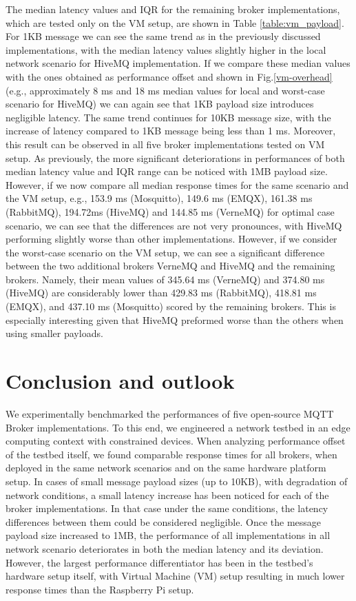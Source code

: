 \documentclass[conference]{IEEEtran}
\begin{document}
    The median latency values and IQR for the remaining broker implementations, which are tested only on
    the VM setup, are shown in Table \ref{table:vm_payload}. For 1KB message we can see the same trend
    as in the previously discussed implementations, with the median latency values slightly higher in
    the local network scenario for HiveMQ implementation. If we compare these median values with the
    ones obtained as performance offset and shown in Fig.\ref{vm-overhead} (e.g., approximately 8 ms and
    18 ms median values for local and worst-case scenario for HiveMQ) we can again see that 1KB
    payload size introduces negligible latency. The same trend continues for 10KB message size, with
    the increase of latency compared to 1KB message being less than 1 ms. Moreover, this result can be observed in all five broker implementations tested on VM setup. As previously, the more significant deteriorations in performances of both median latency value and IQR range can be noticed with 1MB payload size. However, if we now compare all median response times for the same scenario and the VM setup, e.g., 153.9 ms (Mosquitto), 149.6 ms (EMQX), 161.38 ms (RabbitMQ), 194.72ms (HiveMQ) and 144.85 ms (VerneMQ) for optimal case scenario, we can see that the differences are not very pronounces, with HiveMQ performing slightly worse than other implementations. 
    However, if we consider the worst-case scenario on the VM setup, we can see a significant difference
    between the two additional brokers VerneMQ and HiveMQ and the remaining brokers. Namely, their mean
    values of 345.64 ms (VerneMQ) and 374.80 ms (HiveMQ) are considerably lower than 429.83 ms
    (RabbitMQ), 418.81 ms (EMQX), and 437.10 ms (Mosquitto) scored by the remaining brokers. This is
    especially interesting given that HiveMQ preformed worse than the others when using
    smaller payloads.

\section{Conclusion and outlook} \label{concl} 
We experimentally benchmarked the performances of five open-source MQTT Broker implementations. To this end, we engineered a network testbed in an edge computing context with constrained devices. When analyzing performance offset of the testbed itself, we found comparable response times for all brokers, when deployed in the same network scenarios and on the same hardware platform setup. In cases of small message payload sizes (up to 10KB), with degradation of network conditions,  a small latency increase has been noticed for each of the broker implementations. In that case under the same conditions, the latency differences between them could be considered negligible. Once the message payload size increased to 1MB, the performance of all implementations in all network scenario deteriorates  in both the median latency and its deviation. However, the largest performance differentiator has been in the testbed's hardware setup itself, with Virtual Machine (VM) setup resulting in much lower response times than the Raspberry Pi setup. 
\end{document}
